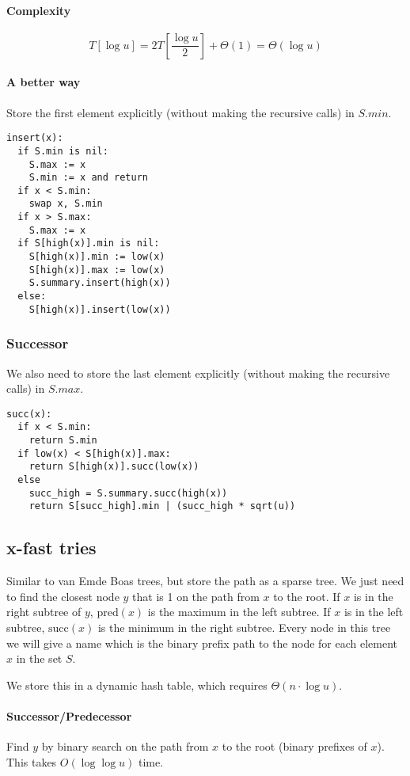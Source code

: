 \documentclass[a4paper]{article}
\begin{document}
\paragraph{Complexity}
\[T[\log u]=2T\left[\frac{\log u}{2}\right] + \Theta(1)=\Theta(\log u)\]

\paragraph{A better way}
Store the first element explicitly (without making the recursive calls) in $S.min$.

\begin{lstlisting}[frame=L]
insert(x):
  if S.min is nil:
    S.max := x
    S.min := x and return
  if x < S.min:
    swap x, S.min
  if x > S.max:
    S.max := x
  if S[high(x)].min is nil:
    S[high(x)].min := low(x)
    S[high(x)].max := low(x)
    S.summary.insert(high(x))
  else:
    S[high(x)].insert(low(x))
\end{lstlisting}

\subsubsection{Successor}
We also need to store the last element explicitly (without making the recursive calls) in $S.max$.

\begin{lstlisting}[frame=L]
succ(x):
  if x < S.min:
    return S.min
  if low(x) < S[high(x)].max:
    return S[high(x)].succ(low(x))
  else
    succ_high = S.summary.succ(high(x))
    return S[succ_high].min | (succ_high * sqrt(u))
\end{lstlisting}

\subsection{x-fast tries}
Similar to van Emde Boas trees, but store the path as a sparse tree. We just need to find the closest node $y$ that is 1 on the path from $x$ to the root. If $x$ is in the right subtree of $y$, $\text{pred}(x)$ is the maximum in the left subtree. If $x$ is in the left subtree, $\text{succ}(x)$ is the minimum in the right subtree. Every node in this tree we will give a name which is the binary prefix path to the node for each element $x$ in the set $S$.

We store this in a dynamic hash table, which requires $\Theta(n\cdot \log u)$.

\paragraph{Successor/Predecessor}
Find $y$ by binary search on the path from $x$ to the root (binary prefixes of $x$). This takes $O(\log\log u)$ time.
\end{document}
